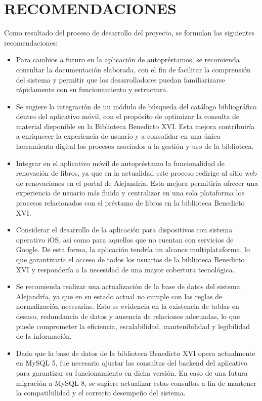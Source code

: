 \documentclass[spanish]{ieee_upb}
\begin{document}
\newpage
\section{RECOMENDACIONES}
Como resultado del proceso de desarrollo del proyecto, se formulan las siguientes recomendaciones:

\begin{itemize}
    \item Para cambios a futuro en la aplicación de autopréstamos, se recomienda consultar la documentación elaborada, con el fin de facilitar la comprensión del sistema y permitir que los desarrolladores puedan familiarizarse rápidamente con su funcionamiento y estructura.
    \item Se sugiere la integración de un módulo de búsqueda del catálogo bibliográfico dentro del aplicativo móvil, con el propósito de optimizar la consulta de material disponible en la Biblioteca Benedicto XVI. Esta mejora contribuiría a enriquecer la experiencia de usuario y a consolidar en una única herramienta digital los procesos asociados a la gestión y uso de la biblioteca.
    \item Integrar en el aplicativo móvil de autopréstamo la funcionalidad de renovación de libros, ya que en la actualidad este proceso redirige al sitio web de renovaciones en el portal de Alejandría. Esta mejora permitiría ofrecer una experiencia de usuario más fluida y centralizar en una sola plataforma los procesos relacionados con el préstamo de libros en la biblioteca Benedicto XVI. 
    \item Considerar el desarrollo de la aplicación para dispositivos con sistema operativo iOS, así como para aquellos que no cuentan con servicios de Google. De esta forma, la aplicación tendría un alcance multiplataforma, lo que garantizaría el acceso de todos los usuarios de la biblioteca Benedicto XVI y respondería a la necesidad de una mayor cobertura tecnológica.
    \item Se recomienda realizar una actualización de la base de datos del sistema Alejandría, ya que en su estado actual no cumple con las reglas de normalización necesarias. Esto se evidencia en la existencia de tablas en desuso, redundancia de datos y ausencia de relaciones adecuadas, lo que puede comprometer la eficiencia, escalabilidad, mantenibilidad y legibilidad de la información.
    \item Dado que la base de datos de la biblioteca Benedicto XVI opera actualmente en MySQL 5, fue necesario ajustar las consultas del backend del aplicativo para garantizar su funcionamiento en dicha versión. En caso de una futura migración a MySQL 8, se sugiere actualizar estas consultas a fin de mantener la compatibilidad y el correcto desempeño del sistema.
\end{itemize}
\end{document}
